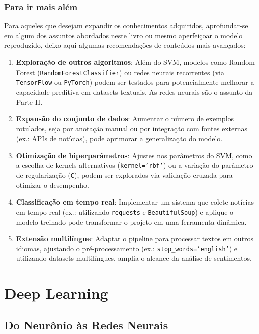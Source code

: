 \documentclass[a4paper,12pt,openany]{book}
\begin{document}
\section{Para ir mais além}
Para aqueles que desejam expandir os conhecimentos adquiridos, aprofundar-se em algum dos assuntos abordados neste livro ou mesmo aperfeiçoar o modelo reproduzido, deixo aqui algumas recomendações de conteúdos mais avançados:
\begin{enumerate}
    \item \textbf{Exploração de outros algoritmos}: Além do SVM, modelos como Random Forest (\texttt{RandomForestClassifier}) ou redes neurais recorrentes (via \texttt{TensorFlow} ou \texttt{PyTorch}) podem ser testados para potencialmente melhorar a capacidade preditiva em datasets textuais. As redes neurais são o assunto da Parte II.
    \item \textbf{Expansão do conjunto de dados}: Aumentar o número de exemplos rotulados, seja por anotação manual ou por integração com fontes externas (ex.: APIs de notícias), pode aprimorar a generalização do modelo.
    \item \textbf{Otimização de hiperparâmetros}: Ajustes nos parâmetros do SVM, como a escolha de kernels alternativos (\texttt{kernel='rbf'}) ou a variação do parâmetro de regularização (\texttt{C}), podem ser explorados via validação cruzada para otimizar o desempenho.
    \item \textbf{Classificação em tempo real}: Implementar um sistema que colete notícias em tempo real (ex.: utilizando \texttt{requests} e \texttt{BeautifulSoup}) e aplique o modelo treinado pode transformar o projeto em uma ferramenta dinâmica.
    \item \textbf{Extensão multilíngue}: Adaptar o pipeline para processar textos em outros idiomas, ajustando o pré-processamento (ex.: \texttt{stop\_words='english'}) e utilizando datasets multilíngues, amplia o alcance da análise de sentimentos.
\end{enumerate}

\part{Deep Learning}

\chapter{Do Neurônio às Redes Neurais}\label{cap:redes_neurais}
\end{document}

